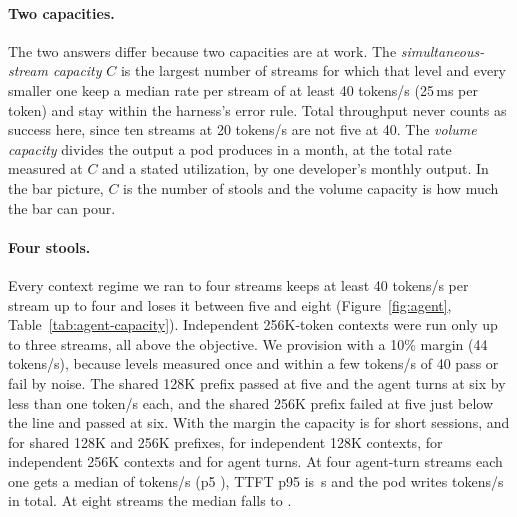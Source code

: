 \paragraph{Two capacities.}
The two answers differ because two capacities are at work. The \emph{simultaneous-stream capacity} $C$ is the largest
number of streams for which that level and every smaller one keep a median rate per stream of at least 40 tokens/s
(25\,ms per token) and stay within the harness's error rule. Total throughput never counts as success here, since ten
streams at 20 tokens/s are not five at 40. The \emph{volume capacity} divides the output a pod produces in a month, at
the total rate measured at $C$ and a stated utilization, by one developer's monthly output. In the bar picture, $C$ is
the number of stools and the volume capacity is how much the bar can pour.

\paragraph{Four stools.}
Every context regime we ran to four streams keeps at least 40 tokens/s per stream up to four and loses it between
five and eight (Figure~\ref{fig:agent}, Table~\ref{tab:agent-capacity}). Independent 256K-token contexts were run only
up to three streams, all above the objective. We provision with a 10\% margin (44 tokens/s), because levels measured
once and within a few tokens/s of 40 pass or fail by noise. The shared 128K prefix passed at five and the agent turns
at six by less than one token/s each, and the shared 256K prefix failed at five just below the line and passed at six.
With the margin the capacity is  for short sessions,  and
 for shared 128K and 256K prefixes,  for independent 128K
contexts,  for independent 256K contexts and  for agent
turns. At four agent-turn streams each one gets a median of  tokens/s (p5
), TTFT p95 is \,s and the pod writes
 tokens/s in total. At eight streams the median falls to
.

